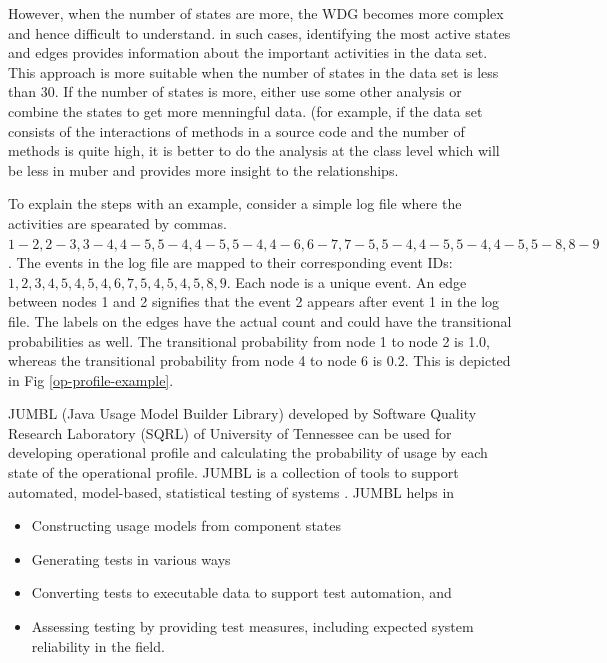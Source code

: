 However, when the number of states are more, the WDG becomes more complex and hence difficult to understand. in such cases, identifying the most active states and edges provides information about the important activities in the data set. This approach is more suitable when the number of states in the data set is less than 30. If the number of states is more, either use some other analysis or combine the states to get more menningful data. (for example, if the data set consists of the interactions of methods in a source code and the number of methods is quite high, it is better to do the analysis at the class level which will be less in muber and provides more insight to the relationships.



To explain the steps with an example, consider a simple log file where the activities are spearated by commas. $1-2, 2-3, 3-4, 4-5, 5-4, 4-5, 5-4, 4-6, 6-7, 7-5, 5-4, 4-5, 5-4, 4-5, 5-8, 8-9$. The events in the log file are mapped to their corresponding event IDs: $1, 2, 3, 4, 5, 4, 5, 4, 6, 7, 5, 4, 5, 4, 5, 8, 9$. Each node is a unique event. An edge between nodes 1 and 2 signifies that the event 2  appears after event 1  in the log file. The labels on the edges have the actual count and could have the transitional probabilities as well. The transitional probability from node 1 to node 2 is 1.0, whereas the transitional probability from node 4 to node 6 is 0.2.  This is depicted in Fig \ref{op-profile-example}.


JUMBL (Java Usage Model Builder Library) developed by Software Quality Research Laboratory (SQRL) of University of Tennessee \cite{jumbl} can be used for developing operational profile and calculating the probability of usage by each state of the operational profile. JUMBL is a collection of tools to support automated, model-based, statistical testing of systems \cite{jug}. JUMBL helps in

\begin{itemize}
\item Constructing usage models from component states
\item Generating tests in various ways
\item Converting tests to executable data to support test automation, and
\item Assessing testing by providing test measures, including expected system reliability in the field.
\end{itemize}


